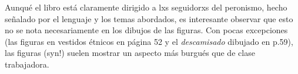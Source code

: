 Aunqué el libro está claramente dirigido a lxs seguidorxs del peronismo,
hecho señalado por el lenguaje y los temas abordados,
es interesante observar que esto no se nota necesariamente en los dibujos de las figuras.
Con pocas excepciones (las figuras en vestidos étnicos en página 52 y el \textit{descamisado} dibujado en p.59),
las figuras (syn!) suelen mostrar un aspecto más burgués que de clase trabajadora.


\begin{comment}

* "Policlínico Evita" (p.43), "Fundación Eva Perón"(p.43), "clubes infantiles Evita" (donde se practica futbol^^)(p.55)
* se rescatan los éxitos (el voto femenino, el pago de las deudas, p.72...)

* p.10: oraciones, rezar, catolicismo; pero también aquí "nunca olvido a Eva Perón, nuestra Madre Espiritual"
  * gottesgleichheit (hat anscheinend die kirche etwas verstoert^^ -- Chamosa o FF?)
  * kann alle wuensche verwirklichen
\end{comment}
